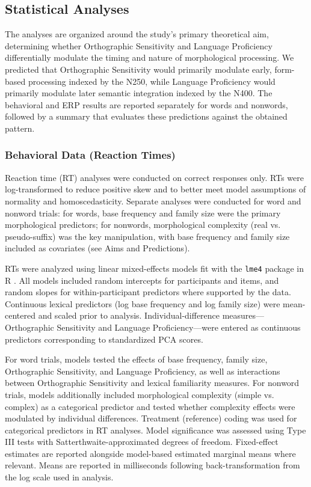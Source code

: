 \documentclass[utf8]{FrontiersinHarvard} %
\begin{document}
	\subsection{Statistical Analyses}
	
	The analyses are organized around the study’s primary theoretical aim, determining whether Orthographic Sensitivity and Language Proficiency differentially modulate the timing and nature of morphological processing. We predicted that Orthographic Sensitivity would primarily modulate early, form-based processing indexed by the N250, while Language Proficiency would primarily modulate later semantic integration indexed by the N400. The behavioral and ERP results are reported separately for words and nonwords, followed by a summary that evaluates these predictions against the obtained pattern.
	
	\subsubsection{Behavioral Data (Reaction Times)}
	Reaction time (RT) analyses were conducted on correct responses only. RTs were log-transformed to reduce positive skew and to better meet model assumptions of normality and homoscedasticity. Separate analyses were conducted for word and nonword trials: for words, base frequency and family size were the primary morphological predictors; for nonwords, morphological complexity (real vs. pseudo-suffix) was the key manipulation, with base frequency and family size included as covariates (see Aims and Predictions).
	
	RTs were analyzed using linear mixed-effects models fit with the \texttt{lme4} package \citep{batesFittingLinearMixedeffects2015} in R \citep{rcoreteamLanguageEnvironmentStatistical2026}. All models included random intercepts for participants and items, and random slopes for within-participant predictors where supported by the data. Continuous lexical predictors (log base frequency and log family size) were mean-centered and scaled prior to analysis. Individual-difference measures—Orthographic Sensitivity and Language Proficiency—were entered as continuous predictors corresponding to standardized PCA scores.
	
	For word trials, models tested the effects of base frequency, family size, Orthographic Sensitivity, and Language Proficiency, as well as interactions between Orthographic Sensitivity and lexical familiarity measures. For nonword trials, models additionally included morphological complexity (simple vs. complex) as a categorical predictor and tested whether complexity effects were modulated by individual differences. Treatment (reference) coding was used for categorical predictors in RT analyses. Model significance was assessed using Type III tests with Satterthwaite-approximated degrees of freedom. Fixed-effect estimates are reported alongside model-based estimated marginal means where relevant. Means are reported in milliseconds following back-transformation from the log scale used in analysis.
	
\end{document}
